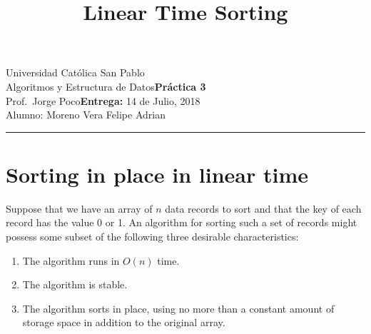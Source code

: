 \documentclass{article}
\title{Linear Time Sorting}
\date{}
\newcommand{\assignment}{Práctica 3}
\newcommand{\duedate}{14 de Julio, 2018}
\begin{document}
Universidad Católica San Pablo\hfill\\
Algoritmos y Estructura de Datos\hfill\textbf{\assignment}\\
Prof.\ Jorge Poco\hfill\textbf{Entrega:} \duedate\\
Alumno: Moreno Vera Felipe Adrian
\smallskip\hrule\bigskip

{\let\newpage\relax\maketitle}

\section{Sorting in place in linear time}
Suppose that we have an array of $n$ data records to sort and that the key of each record has the value 0 or 1. An algorithm for sorting such a set of records might possess some subset of the following three desirable characteristics:

\begin{enumerate}
  \item The algorithm runs in $O(n)$ time.
  \item The algorithm is stable.
  \item The algorithm sorts in place, using no more than a constant amount of storage space in addition to the original array.
\end{enumerate}
\end{document}
